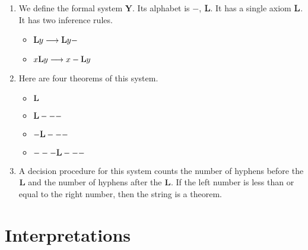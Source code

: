 \documentclass[11pt,letterpaper]{article}
\begin{document}
\begin{enumerate}
    \newcommand{\ysys}{\mathbf{Y}}
  \item
    We define the formal system $\ysys$.
    \newcommand{\Lop}{\mathqd{L}}
    Its alphabet is $-$, $\Lop$.
    It has a single axiom $\Lop$.
    It has two inference rules.
    \begin{itemize}
      \item
        $\Lop y \rewrite \Lop y-$
      \item
        $x \Lop y \rewrite x-\Lop y$
    \end{itemize}

  \item
    Here are four theorems of this system.
    \begin{itemize}
      \item $\Lop$
      \item $\Lop---$
      \item $-\Lop---$
      \item $---\Lop---$
    \end{itemize}

  \item
    A decision procedure for this system counts the number of hyphens before
    the $\Lop$ and the number of hyphens after the $\Lop$. If the left number
    is less than or equal to the right number, then the string is a theorem.
\end{enumerate}

\section{Interpretations}
\end{document}

